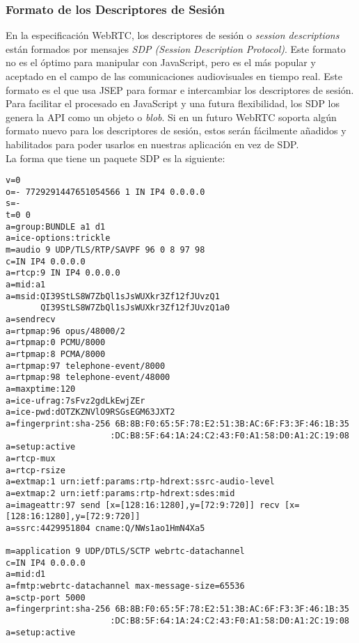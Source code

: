 \subsubsection{Formato de los Descriptores de Sesión}

En la especificación WebRTC, los descriptores de sesión o \emph{session descriptions} están formados por mensajes \textit{SDP (Session Description Protocol)}. Este formato no es el óptimo para manipular con JavaScript, pero es el más popular y aceptado en el campo de las comunicaciones audiovisuales en tiempo real. Este formato es el que usa JSEP para formar e intercambiar los descriptores de sesión.\\

Para facilitar el procesado en JavaScript y una futura flexibilidad, los SDP los genera la API como un objeto o \textit{blob}. Si en un futuro WebRTC soporta algún formato nuevo para los descriptores de sesión, estos serán fácilmente añadidos y habilitados para poder usarlos en nuestras aplicación en vez de SDP.\\

La forma que tiene un paquete SDP es la siguiente:

\begin{lstlisting}[caption=Ejemplo paquete SDP]
v=0
o=- 7729291447651054566 1 IN IP4 0.0.0.0
s=-
t=0 0
a=group:BUNDLE a1 d1
a=ice-options:trickle
m=audio 9 UDP/TLS/RTP/SAVPF 96 0 8 97 98
c=IN IP4 0.0.0.0
a=rtcp:9 IN IP4 0.0.0.0
a=mid:a1
a=msid:QI39StLS8W7ZbQl1sJsWUXkr3Zf12fJUvzQ1
       QI39StLS8W7ZbQl1sJsWUXkr3Zf12fJUvzQ1a0
a=sendrecv
a=rtpmap:96 opus/48000/2
a=rtpmap:0 PCMU/8000
a=rtpmap:8 PCMA/8000
a=rtpmap:97 telephone-event/8000
a=rtpmap:98 telephone-event/48000
a=maxptime:120
a=ice-ufrag:7sFvz2gdLkEwjZEr
a=ice-pwd:dOTZKZNVlO9RSGsEGM63JXT2
a=fingerprint:sha-256 6B:8B:F0:65:5F:78:E2:51:3B:AC:6F:F3:3F:46:1B:35
                     :DC:B8:5F:64:1A:24:C2:43:F0:A1:58:D0:A1:2C:19:08
a=setup:active
a=rtcp-mux
a=rtcp-rsize
a=extmap:1 urn:ietf:params:rtp-hdrext:ssrc-audio-level
a=extmap:2 urn:ietf:params:rtp-hdrext:sdes:mid
a=imageattr:97 send [x=[128:16:1280],y=[72:9:720]] recv [x=[128:16:1280],y=[72:9:720]]
a=ssrc:4429951804 cname:Q/NWs1ao1HmN4Xa5

m=application 9 UDP/DTLS/SCTP webrtc-datachannel
c=IN IP4 0.0.0.0
a=mid:d1
a=fmtp:webrtc-datachannel max-message-size=65536
a=sctp-port 5000
a=fingerprint:sha-256 6B:8B:F0:65:5F:78:E2:51:3B:AC:6F:F3:3F:46:1B:35
                     :DC:B8:5F:64:1A:24:C2:43:F0:A1:58:D0:A1:2C:19:08
a=setup:active
\end{lstlisting}


